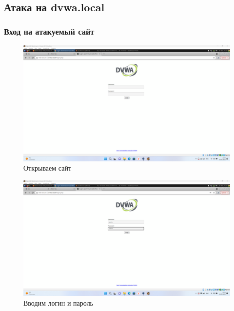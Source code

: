 \documentclass[a4paper]{article}
\begin{document}
  \subsection{Атака на dvwa.local}

  \subsubsection{Вход на атакуемый сайт}

  \begin{figure}[H]
    \centering
    \includegraphics[width=\textwidth]{Screenshot_84}
    \caption{Открываем сайт}
  \end{figure}

  \begin{figure}[H]
    \centering
    \includegraphics[width=\textwidth]{Screenshot_86}
    \caption{Вводим логин и пароль}
  \end{figure}
\end{document}
